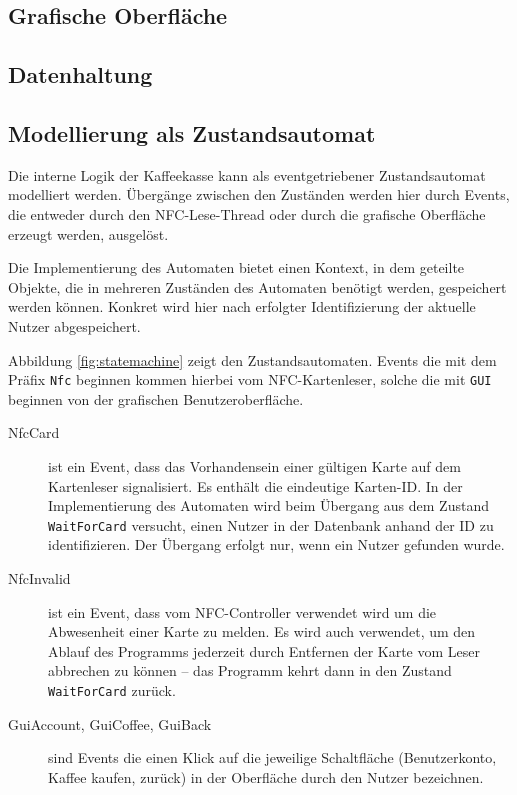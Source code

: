 \documentclass[11pt,a4paper]{IEEEtran} \usepackage[ngerman]{babel}
\begin{document}
\subsection{Grafische Oberfläche} \label{sec:gui}

\subsection{Datenhaltung}

\subsection{Modellierung als Zustandsautomat}

\begin{figure*}[ht!]
    \centering
    
    \caption{Darstellung der internen Logik des Programms als Zustandsautomat.}
    \label{fig:statemachine}
\end{figure*}

Die interne Logik der Kaffeekasse kann als eventgetriebener Zustandsautomat 
modelliert werden. Übergänge zwischen den Zuständen werden hier durch Events,
die entweder durch den NFC-Lese-Thread oder durch die grafische Oberfläche
erzeugt werden, ausgelöst. 

Die Implementierung des Automaten bietet einen Kontext, in dem geteilte
Objekte, die in mehreren Zuständen des Automaten benötigt werden, gespeichert 
werden können. Konkret wird hier nach erfolgter Identifizierung der aktuelle
Nutzer abgespeichert.

Abbildung \ref{fig:statemachine} zeigt den Zustandsautomaten. Events die
mit dem Präfix \texttt{Nfc} beginnen kommen hierbei vom NFC-Kartenleser, solche
die mit \texttt{GUI} beginnen von der grafischen Benutzeroberfläche. 

\begin{description}
    \item[NfcCard] ist ein Event, dass das Vorhandensein einer gültigen
        Karte auf dem Kartenleser signalisiert. Es enthält die eindeutige 
        Karten-ID. In der Implementierung des Automaten wird beim Übergang aus
        dem Zustand \texttt{WaitForCard} versucht, einen Nutzer in der
        Datenbank anhand der ID zu identifizieren. Der Übergang erfolgt nur,
        wenn ein Nutzer gefunden wurde.
    \item[NfcInvalid] ist ein Event, dass vom NFC-Controller verwendet wird
        um die Abwesenheit einer Karte zu melden. Es wird auch verwendet, um 
        den Ablauf des Programms jederzeit durch Entfernen der Karte vom Leser
        abbrechen zu können -- das Programm kehrt dann in den Zustand
        \texttt{WaitForCard} zurück.
    \item[GuiAccount, GuiCoffee, GuiBack] sind Events die einen Klick auf die
        jeweilige Schaltfläche (Benutzerkonto, Kaffee kaufen, zurück) in der 
        Oberfläche durch den Nutzer bezeichnen.
\end{description}
\end{document}
